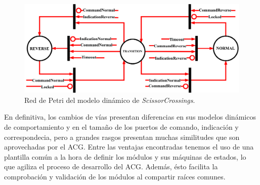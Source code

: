 	\begin{figure}[H]
		\centering
		\includegraphics[width=1\textwidth]{Figuras/SSW_Petri}
		\centering\caption{Red de Petri del modelo dinámico de \textit{ScissorCrossings}.}
		\label{fig:SCR_Petri}
	\end{figure}
	
	En definitiva, los cambios de vías presentan diferencias en sus modelos dinámicos de comportamiento y en el tamaño de los puertos de comando, indicación y correspondecia, pero a grandes rasgos presentan muchas similitudes que son aprovechadas por el ACG. Entre las ventajas encontradas tenemos el uso de una plantilla común a la hora de definir los módulos y sus máquinas de estados, lo que agiliza el proceso de desarrollo del ACG. Además, ésto facilita la comprobación y validación de los módulos al compartir raíces comunes.
